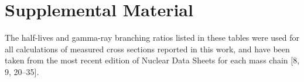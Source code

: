 \documentclass[a4paper,10pt]{article}
\title{}
\author{}
\begin{document}

% 


\section{Supplemental Material} \label{fe_supp_material}
% 
The   half-lives and gamma-ray branching ratios  listed in these tables were used for all calculations of measured cross sections reported in this work, and have been taken from the most recent edition of  Nuclear Data Sheets for each  mass chain  [8, 9, 20--35].
\end{document}
